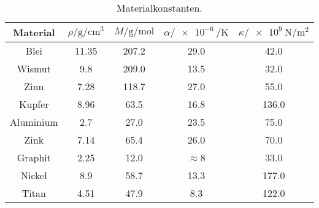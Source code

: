 \begin{table}
    \centering
    \caption{Materialkonstanten\cite{v201}.}
    \label{tab:const}
    \begin{tabular}{c S[table-format=2.2(0)e0] S[table-format=3.1(0)e0] S[table-format=2.1] S[table-format=3.1(0)e0] }
        \toprule
        {Material} & {$ρ/\si{\gram\per\cm\cubed}$} & {$M/\si{\gram\per\mol}$} & {$α/\SI{e-6}{\per\kelvin}$} & {$κ/\SI{e9}{\newton\per\meter\squared}$} \\
        \midrule
        {Blei}      & 11.35 & 207.2 & 29.0              & 42.0  \\
        {Wismut}    & 9.8   & 209.0 & 13.5              & 32.0  \\
        {Zinn}      & 7.28  & 118.7 & 27.0              & 55.0  \\
        {Kupfer}    & 8.96  & 63.5  & 16.8              & 136.0     \\
        {Aluminium} & 2.7   & 27.0  & 23.5              & 75.0  \\
        {Zink}      & 7.14  & 65.4  & 26.0              & 70.0  \\
        {Graphit}   & 2.25  & 12.0  & {\!\!$\approx$}8    & 33.0  \\
        {Nickel}    & 8.9   & 58.7  & 13.3              & 177.0     \\
        {Titan} & 4.51  & 47.9  & 8.3   & 122.0     \\
        \bottomrule
    \end{tabular}
\end{table}
